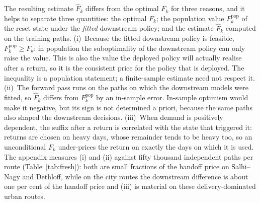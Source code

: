\documentclass[preprint,authoryear,12pt]{elsarticle}
\theoremstyle{definition}
\theoremstyle{remark}
\begin{document}
The resulting estimate $\widehat F_k$ differs from the optimal $F_k$ for
three reasons, and it helps to separate three quantities: the optimal
$F_k$; the population value $F^{\mathrm{pop}}_k$ of the reset state under
the \emph{fitted} downstream policy; and the estimate $\widehat F_k$
computed on the training paths. (i)~Because the fitted downstream policy
is feasible, $F^{\mathrm{pop}}_k \ge F_k$: in population the
suboptimality of the downstream policy can only raise the value. This is
also the value the deployed policy will actually realise after a
return, so it is the consistent price for the policy that is deployed.
The inequality is a population statement; a finite-sample estimate need
not respect it. (ii)~The forward pass runs on the paths on which the
downstream models were fitted, so $\widehat F_k$ differs from
$F^{\mathrm{pop}}_k$ by an in-sample error. In-sample optimism would make
it negative, but its sign is not determined a priori, because the same
paths also shaped the downstream decisions. (iii)~When demand is
positively dependent, the suffix after a return is correlated with the
state that triggered it: returns are chosen on heavy days, whose
remainder tends to be heavy too, so an unconditional $F_k$ under-prices
the return on exactly the days on which it is used. The appendix
measures (i) and (ii) against fifty thousand independent paths per
route (Table~\ref{tab:fresh}): both are small fractions of the handoff
price on Salhi--Nagy and Dethloff, while on the city routes the
downstream difference is about one per cent of the handoff price and
(iii) is material on these delivery-dominated urban routes.
\end{document}
